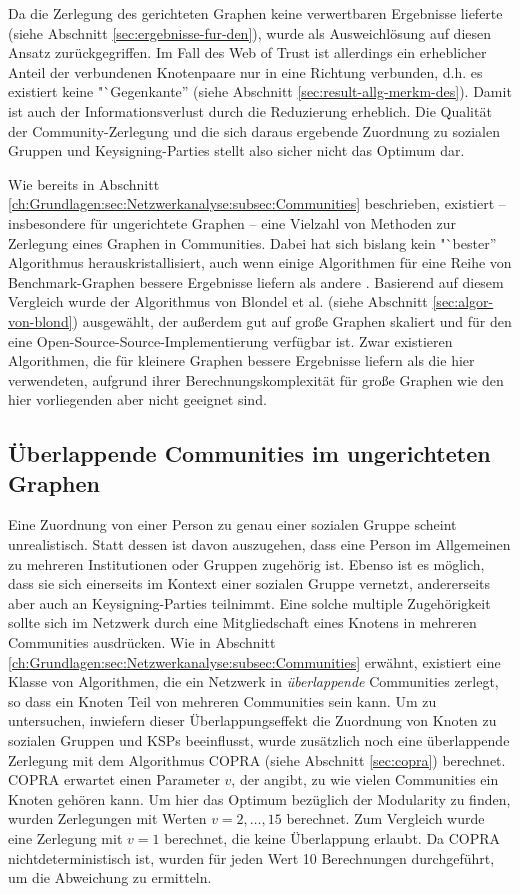 Da die Zerlegung des gerichteten Graphen keine verwertbaren Ergebnisse
lieferte (siehe Abschnitt \ref{sec:ergebnisse-fur-den}), wurde als
Ausweichlösung auf diesen Ansatz zurückgegriffen.  Im Fall des Web
of Trust ist allerdings ein erheblicher Anteil der verbundenen
Knotenpaare nur in eine Richtung verbunden, d.h. es existiert keine
"`Gegenkante'' (siehe Abschnitt
\ref{sec:result-allg-merkm-des}). Damit ist auch der
Informationsverlust durch die Reduzierung erheblich. Die Qualität
der Community-Zerlegung und die sich daraus ergebende Zuordnung zu
sozialen Gruppen und Keysigning-Parties stellt also sicher nicht das
Optimum dar.

Wie bereits in Abschnitt
\ref{ch:Grundlagen:sec:Netzwerkanalyse:subsec:Communities}
beschrieben, existiert -- insbesondere für ungerichtete Graphen --
eine Vielzahl von Methoden zur Zerlegung eines Graphen in
Communities. Dabei hat sich bislang kein "`bester'' Algorithmus
herauskristallisiert, auch wenn einige Algorithmen für eine Reihe
von Benchmark-Graphen bessere Ergebnisse liefern als andere
\cite{Lancichinetti2009}. Basierend auf diesem Vergleich wurde der
Algorithmus von Blondel et al. (siehe Abschnitt
\ref{sec:algor-von-blond}) ausgewählt, der außerdem gut auf große
Graphen skaliert und für den eine Open-Source-Source-Implementierung
verfügbar ist.  Zwar existieren Algorithmen, die für kleinere
Graphen bessere Ergebnisse liefern als die hier verwendeten, aufgrund
ihrer Berechnungskomplexität für große Graphen wie den hier
vorliegenden aber nicht geeignet sind.

\subsection{Überlappende Communities im ungerichteten Graphen}
\label{sec:uberl-comm-unger}

Eine Zuordnung von einer Person zu genau einer sozialen Gruppe scheint
unrealistisch. Statt dessen ist davon auszugehen, dass eine Person im
Allgemeinen zu mehreren Institutionen oder Gruppen zugehörig
ist. Ebenso ist es möglich, dass sie sich einerseits im Kontext einer
sozialen Gruppe vernetzt, andererseits aber auch an Keysigning-Parties
teilnimmt. Eine solche multiple Zugehörigkeit sollte sich im Netzwerk
durch eine Mitgliedschaft eines Knotens in mehreren Communities
ausdrücken. Wie in Abschnitt
\ref{ch:Grundlagen:sec:Netzwerkanalyse:subsec:Communities} erwähnt,
existiert eine Klasse von Algorithmen, die ein Netzwerk in
\emph{überlappende} Communities zerlegt, so dass ein Knoten Teil von
mehreren Communities sein kann. Um zu untersuchen, inwiefern dieser
Überlappungseffekt die Zuordnung von Knoten zu sozialen Gruppen und
KSPs beeinflusst, wurde zusätzlich noch eine überlappende Zerlegung
mit dem Algorithmus COPRA (siehe Abschnitt \ref{sec:copra})
berechnet. COPRA erwartet einen Parameter $v$, der angibt, zu wie
vielen Communities ein Knoten gehören kann. Um hier das Optimum
bezüglich der Modularity zu finden, wurden Zerlegungen mit Werten
$v=2, \dots, 15$ berechnet. Zum Vergleich wurde eine Zerlegung mit
$v=1$ berechnet, die keine Überlappung erlaubt. Da COPRA
nichtdeterministisch ist, wurden für jeden Wert 10 Berechnungen
durchgeführt, um die Abweichung zu ermitteln.



